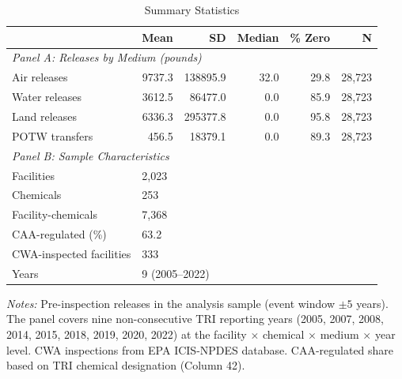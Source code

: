 \begin{table}[htbp]
\centering
\caption{Summary Statistics}
\label{tab:summary}
\begin{tabular}{lrrrrr}
\toprule
& Mean & SD & Median & \% Zero & N \\
\midrule
\multicolumn{6}{l}{\textit{Panel A: Releases by Medium (pounds)}} \\[3pt]
Air releases & 9737.3 & 138895.9 & 32.0 & 29.8 & 28,723 \\
Water releases & 3612.5 & 86477.0 & 0.0 & 85.9 & 28,723 \\
Land releases & 6336.3 & 295377.8 & 0.0 & 95.8 & 28,723 \\
POTW transfers & 456.5 & 18379.1 & 0.0 & 89.3 & 28,723 \\
\midrule
\multicolumn{6}{l}{\textit{Panel B: Sample Characteristics}} \\[3pt]
Facilities & \multicolumn{5}{l}{2,023} \\
Chemicals & \multicolumn{5}{l}{253} \\
Facility-chemicals & \multicolumn{5}{l}{7,368} \\
CAA-regulated (\%) & \multicolumn{5}{l}{63.2} \\
CWA-inspected facilities & \multicolumn{5}{l}{333} \\
Years & \multicolumn{5}{l}{9 (2005--2022)} \\
\bottomrule
\end{tabular}
\begin{minipage}{0.95\textwidth}
\vspace{0.3em}
\footnotesize \textit{Notes:} Pre-inspection releases in the analysis sample (event window $\pm 5$ years). The panel covers nine non-consecutive TRI reporting years (2005, 2007, 2008, 2014, 2015, 2018, 2019, 2020, 2022) at the facility $\times$ chemical $\times$ medium $\times$ year level. CWA inspections from EPA ICIS-NPDES database. CAA-regulated share based on TRI chemical designation (Column 42).
\end{minipage}
\end{table}
